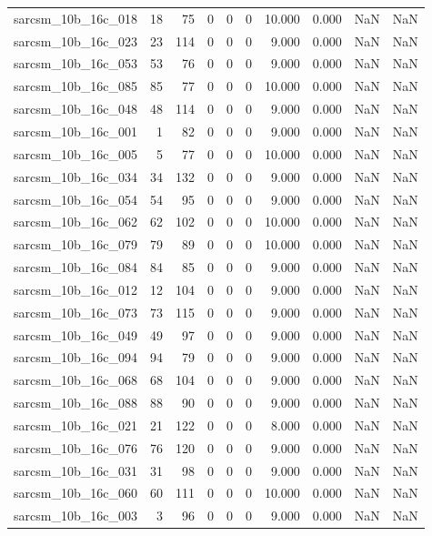 \documentclass{article}
\begin{document}
\begin{longtable}{lrrrrrrrrr}
sarcsm\_10b\_16c\_018 & 18 & 75 & 0 & 0 & 0 & 10.000 & 0.000 & NaN & NaN \\
sarcsm\_10b\_16c\_023 & 23 & 114 & 0 & 0 & 0 & 9.000 & 0.000 & NaN & NaN \\
sarcsm\_10b\_16c\_053 & 53 & 76 & 0 & 0 & 0 & 9.000 & 0.000 & NaN & NaN \\
sarcsm\_10b\_16c\_085 & 85 & 77 & 0 & 0 & 0 & 10.000 & 0.000 & NaN & NaN \\
sarcsm\_10b\_16c\_048 & 48 & 114 & 0 & 0 & 0 & 9.000 & 0.000 & NaN & NaN \\
sarcsm\_10b\_16c\_001 & 1 & 82 & 0 & 0 & 0 & 9.000 & 0.000 & NaN & NaN \\
sarcsm\_10b\_16c\_005 & 5 & 77 & 0 & 0 & 0 & 10.000 & 0.000 & NaN & NaN \\
sarcsm\_10b\_16c\_034 & 34 & 132 & 0 & 0 & 0 & 9.000 & 0.000 & NaN & NaN \\
sarcsm\_10b\_16c\_054 & 54 & 95 & 0 & 0 & 0 & 9.000 & 0.000 & NaN & NaN \\
sarcsm\_10b\_16c\_062 & 62 & 102 & 0 & 0 & 0 & 10.000 & 0.000 & NaN & NaN \\
sarcsm\_10b\_16c\_079 & 79 & 89 & 0 & 0 & 0 & 10.000 & 0.000 & NaN & NaN \\
sarcsm\_10b\_16c\_084 & 84 & 85 & 0 & 0 & 0 & 9.000 & 0.000 & NaN & NaN \\
sarcsm\_10b\_16c\_012 & 12 & 104 & 0 & 0 & 0 & 9.000 & 0.000 & NaN & NaN \\
sarcsm\_10b\_16c\_073 & 73 & 115 & 0 & 0 & 0 & 9.000 & 0.000 & NaN & NaN \\
sarcsm\_10b\_16c\_049 & 49 & 97 & 0 & 0 & 0 & 9.000 & 0.000 & NaN & NaN \\
sarcsm\_10b\_16c\_094 & 94 & 79 & 0 & 0 & 0 & 9.000 & 0.000 & NaN & NaN \\
sarcsm\_10b\_16c\_068 & 68 & 104 & 0 & 0 & 0 & 9.000 & 0.000 & NaN & NaN \\
sarcsm\_10b\_16c\_088 & 88 & 90 & 0 & 0 & 0 & 9.000 & 0.000 & NaN & NaN \\
sarcsm\_10b\_16c\_021 & 21 & 122 & 0 & 0 & 0 & 8.000 & 0.000 & NaN & NaN \\
sarcsm\_10b\_16c\_076 & 76 & 120 & 0 & 0 & 0 & 9.000 & 0.000 & NaN & NaN \\
sarcsm\_10b\_16c\_031 & 31 & 98 & 0 & 0 & 0 & 9.000 & 0.000 & NaN & NaN \\
sarcsm\_10b\_16c\_060 & 60 & 111 & 0 & 0 & 0 & 10.000 & 0.000 & NaN & NaN \\
sarcsm\_10b\_16c\_003 & 3 & 96 & 0 & 0 & 0 & 9.000 & 0.000 & NaN & NaN \\

\end{longtable}
\end{document}
